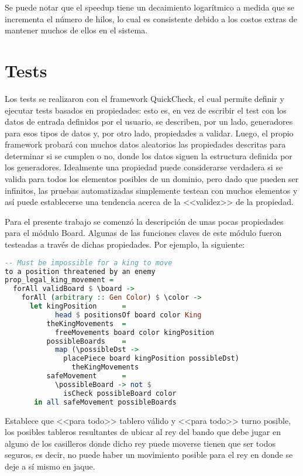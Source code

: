 \documentclass{llncs}
\begin{document}
Se puede notar que el speedup tiene un decaimiento logarítmico a medida que se incrementa el número de hilos, lo cual es consistente debido a los costos extras de mantener muchos de ellos en el sistema.


\section{Tests}

Los tests se realizaron con el framework QuickCheck, el cual permite definir y ejecutar tests basados en propiedades: esto es, en vez de escribir el test con los datos de entrada definidos por el usuario, se describen, por un lado, generadores para esos tipos de datos y, por otro lado, propiedades a validar. Luego, el propio framework probará con muchos datos aleatorios las propiedades descritas para determinar si se cumplen o no, donde los datos siguen la estructura definida por los generadores. Idealmente una propiedad puede considerarse verdadera si se valida para todos los elementos posibles de un dominio, pero dado que pueden ser infinitos, las pruebas automatizadas simplemente testean con muchos elementos y así puede establecerse una tendencia acerca de la <<validez>> de la propiedad.

Para el presente trabajo se comenzó la descripción de unas pocas propiedades para el módulo Board. Algunas de las funciones claves de este módulo fueron testeadas a través de dichas propiedades. Por ejemplo, la siguiente:

\begin{lstlisting}[frame=single, language=haskell, captionpos=b, caption=Propiedad sobre los movimientos legales del rey]
-- Must be impossible for a king to move
to a position threatened by an enemy
prop_legal_king_movement =
  forAll validBoard $ \board ->
    forAll (arbitrary :: Gen Color) $ \color ->
      let kingPosition      =
            head $ positionsOf board color King
          theKingMovements  =
            freeMovements board color kingPosition
          possibleBoards    =
            map (\possibleDst ->
              placePiece board kingPosition possibleDst)
                theKingMovements
          safeMovement      =
            \possibleBoard -> not $
              isCheck possibleBoard color
       in all safeMovement possibleBoards
\end{lstlisting}

Establece que <<para todo>> tablero válido y <<para todo>> turno posible, los posibles tableros resultantes de ubicar al rey del bando que debe jugar en alguno de los casilleros donde dicho rey puede moverse tienen que ser todos seguros, es decir, no puede haber un movimiento posible para el rey en donde se deje a sí mismo en jaque.
\end{document}
